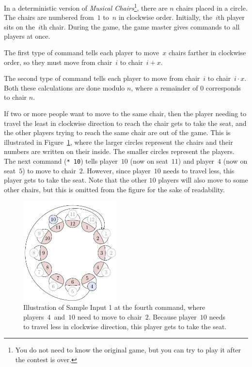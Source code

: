 \problemname{\problemyamlname}

%
In a deterministic version of \emph{Musical Chairs}\footnote{You do not need to know the original game, but you can try to play it after the contest is over.}, there are $n$ chairs placed in a circle.
The chairs are numbered from~$1$ to~$n$ in clockwise order.
Initially, the~$i$th player sits on the~$i$th chair.
During the game, the game master gives commands to all players at once.

The first type of command tells each player to move~$x$ chairs farther in clockwise order,
so they must move from chair~$i$ to chair~$i+x$.

The second type of command tells each player to move from chair~$i$ to chair~$i\cdot{}x$.
Both these calculations are done modulo $n$, where a remainder of $0$ corresponds to chair $n$.

If two or more people want to move to the same chair,
then the player needing to travel the least in clockwise direction to reach the chair gets to take the seat,
and the other players trying to reach the same chair are out of the game.
This is illustrated in Figure~\ref{fig:chairs},
where the larger circles represent the chairs and their numbers are written on their inside.
The smaller circles represent the players.
The next command (\texttt{* 10}) tells player~$10$ (now on seat~$11$) and player~$4$ (now on seat~$5$) to move to chair~$2$.
However, since player~$10$ needs to travel less, this player gets to take the seat.
Note that the other $10$ players will also move to some other chairs,
but this is omitted from the figure for the sake of readability.

\begin{figure}[!h]
  \centering
  \includegraphics[width=0.45\textwidth]{sample}
  \caption{
    Illustration of Sample Input 1 at the fourth command, where players~$4$~and~$10$ need to move to chair~$2$.
    Because player~$10$ needs to travel less in clockwise direction, this player gets to take the seat.
  }
  \label{fig:chairs}
\end{figure}

